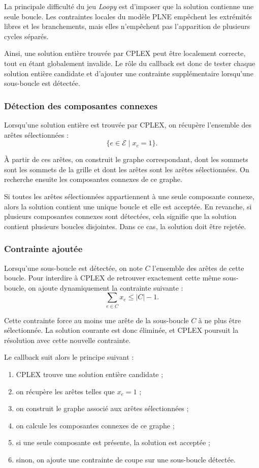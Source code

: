 La principale difficulté du jeu \textit{Loopy} est d'imposer que la solution contienne une seule boucle. Les contraintes locales du modèle PLNE empêchent les extrémités libres et les branchements, mais elles n'empêchent pas l'apparition de plusieurs cycles séparés.

Ainsi, une solution entière trouvée par CPLEX peut être localement correcte, tout en étant globalement invalide. Le rôle du callback est donc de tester chaque solution entière candidate et d'ajouter une contrainte supplémentaire lorsqu'une sous-boucle est détectée.

\subsubsection{Détection des composantes connexes}

Lorsqu'une solution entière est trouvée par CPLEX, on récupère l'ensemble des arêtes sélectionnées :
\[
\{e \in \mathcal{E} \mid x_e = 1\}.
\]

À partir de ces arêtes, on construit le graphe correspondant, dont les sommets sont les sommets de la grille et dont les arêtes sont les arêtes sélectionnées. On recherche ensuite les composantes connexes de ce graphe.

Si toutes les arêtes sélectionnées appartiennent à une seule composante connexe, alors la solution contient une unique boucle et elle est acceptée. En revanche, si plusieurs composantes connexes sont détectées, cela signifie que la solution contient plusieurs boucles disjointes. Dans ce cas, la solution doit être rejetée.

\subsubsection{Contrainte ajoutée}

Lorsqu'une sous-boucle est détectée, on note \(C\) l'ensemble des arêtes de cette boucle. Pour interdire à CPLEX de retrouver exactement cette même sous-boucle, on ajoute dynamiquement la contrainte suivante :
\[
\sum_{e \in C} x_e \leq |C| - 1.
\]

Cette contrainte force au moins une arête de la sous-boucle \(C\) à ne plus être sélectionnée. La solution courante est donc éliminée, et CPLEX poursuit la résolution avec cette nouvelle contrainte.

Le callback suit alors le principe suivant :
\begin{enumerate}
    \item CPLEX trouve une solution entière candidate ;
    \item on récupère les arêtes telles que \(x_e = 1\) ;
    \item on construit le graphe associé aux arêtes sélectionnées ;
    \item on calcule les composantes connexes de ce graphe ;
    \item si une seule composante est présente, la solution est acceptée ;
    \item sinon, on ajoute une contrainte de coupe sur une sous-boucle détectée.
\end{enumerate}

